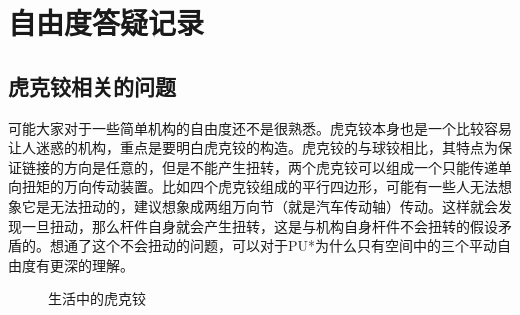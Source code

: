 \section{自由度答疑记录}

\subsection{虎克铰相关的问题}

可能大家对于一些简单机构的自由度还不是很熟悉。虎克铰本身也是一个比较容易让人迷惑的机构，重点是要明白虎克铰的构造。虎克铰的与球铰相比，其特点为保证链接的方向是任意的，但是不能产生扭转，两个虎克铰可以组成一个只能传递单向扭矩的万向传动装置。比如四个虎克铰组成的平行四边形，可能有一些人无法想象它是无法扭动的，建议想象成两组万向节（就是汽车传动轴）传动。这样就会发现一旦扭动，那么杆件自身就会产生扭转，这是与机构自身杆件不会扭转的假设矛盾的。想通了这个不会扭动的问题，可以对于PU*为什么只有空间中的三个平动自由度有更深的理解。

\begin{figure}[htb]
    \centering
    \hfill
    \caption{生活中的虎克铰}
\end{figure}

